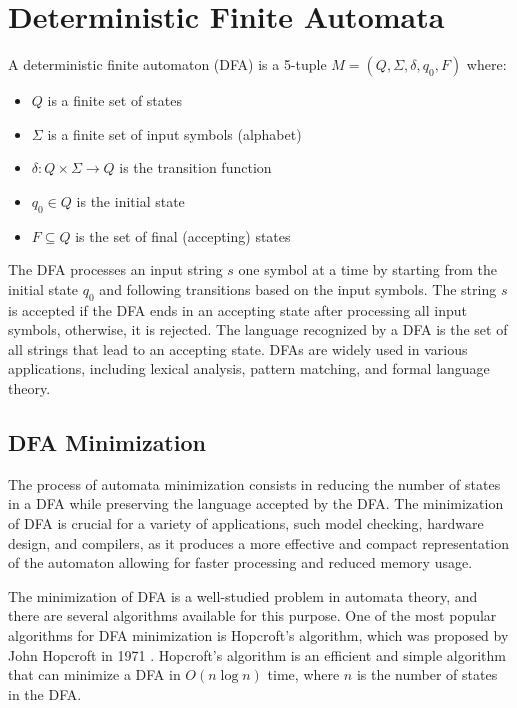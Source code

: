 \section{Deterministic Finite Automata}
\begin{definition} \label{def:dfa}
    A deterministic finite automaton (DFA) is a 5-tuple $M = (Q, \Sigma, \delta, q_0, F)$ where:
    \begin{itemize}[leftmargin=25pt]
        \item $Q$ is a finite set of states
        \item $\Sigma$ is a finite set of input symbols (alphabet)
        \item $\delta: Q \times \Sigma \rightarrow Q$ is the transition function
        \item $q_0 \in Q$ is the initial state
        \item $F \subseteq Q$ is the set of final (accepting) states
    \end{itemize}
\end{definition}

The DFA processes an input string $s$ one symbol at a time by starting from the initial state $q_0$ and following transitions based on the input symbols. The string $s$ is accepted if the DFA ends in an accepting state after processing all input symbols, otherwise, it is rejected. The language recognized by a DFA is the set of all strings that lead to an accepting state. DFAs are widely used in various applications, including lexical analysis, pattern matching, and formal language theory. 

\subsection{DFA Minimization}
The process of automata minimization consists in reducing the number of states in a DFA while preserving the language accepted by the DFA. The minimization of DFA is crucial for a variety of applications, such model checking, hardware design, and compilers, as it produces a more effective and compact representation of the automaton allowing for faster processing and reduced memory usage.

The minimization of DFA is a well-studied problem in automata theory, and there are several algorithms available for this purpose. One of the most popular algorithms for DFA minimization is Hopcroft's algorithm, which was proposed by John Hopcroft in 1971 \cite{HOPCROFT1971189}. Hopcroft's algorithm is an efficient and simple algorithm that can minimize a DFA in $O(n \log n)$ time, where $n$ is the number of states in the DFA.

